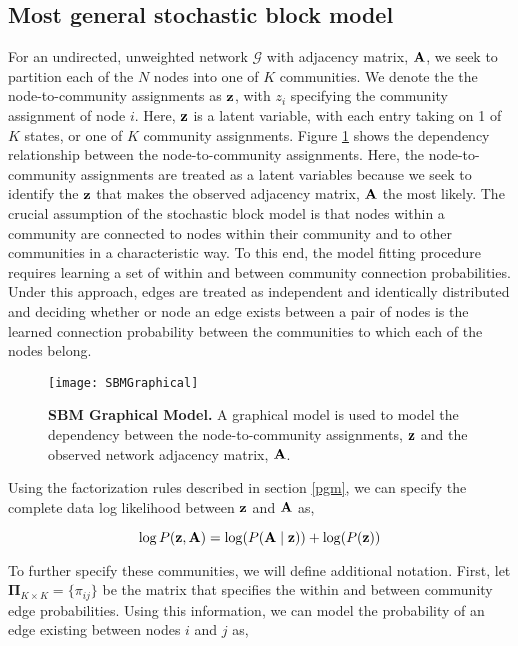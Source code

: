 \subsection{Most general stochastic block model}
For an undirected, unweighted network $\mathcal{G}$ with adjacency matrix, ${\bf A}$, we seek to partition each of the $N$ nodes into one of $K$ communities. We denote the the node-to-community assignments as ${\bf z}$, with $z_{i}$ specifying the community assignment of node $i$. Here, ${\bf z}$ is a latent variable, with each entry taking on 1 of $K$ states, or one of $K$ community assignments. Figure \ref{fig:graphical} shows the dependency relationship between the node-to-community assignments. Here, the node-to-community assignments are treated as a latent variables because we seek to identify the ${\bf z}$ that makes the observed adjacency matrix, ${\bf A}$ the most likely.  The crucial assumption of the stochastic block model is that nodes within a community are connected to nodes within their community and to other communities in a characteristic way. To this end, the model fitting procedure requires learning a set of within and between community connection probabilities. Under this approach, edges are treated as independent and identically distributed and deciding whether or node an edge exists between a pair of nodes is the learned connection probability between the communities to which each of the nodes belong.

\begin{figure}
\begin{center}
\texttt{[image: SBMGraphical]}
\caption{{\bf SBM Graphical Model.} A graphical model is used to model the dependency between the node-to-community assignments, ${\bf z}$ and the observed network adjacency matrix, ${\bf A}$.}
\label{fig:graphical}
\end{center}
\end{figure}

Using the factorization rules described in section \ref{pgm}, we can specify the complete data log likelihood between ${\bf z}$ and ${\bf A}$ as,

\begin{equation}
\log P({\bf z},{\bf A})=\log(P({\bf A} \mid {\bf z}))+\log(P({\bf z}))
\end{equation}

To further specify these communities, we will define additional notation. First, let ${\boldsymbol \Pi}_{K \times K}=\{\pi_{ij}\}$ be the matrix that specifies the within and between community edge probabilities. Using this information, we can model the probability of an edge existing between nodes $i$ and $j$ as,

